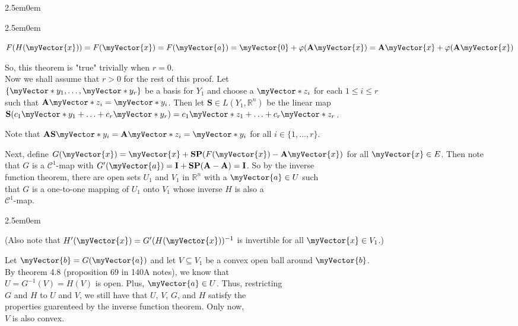 \documentclass{book}
\newenvironment{myIndent}{%
   \begin{adjustwidth}{2.5em}{0em}%
}{%
   \end{adjustwidth}%
}
\newcommand{\retTwo}{\hfill\bigbreak}
\newcommand{\mVec}[1]{\myVector{#1}}
\newcommand{\mVecAst}[1]{\myVector*{#1}}
\newcommand{\mMat}[1]{\mathbf{#1}}
\begin{document}
{\begin{myIndent}
{\begin{myIndent}
      {\centering $F(H(\mVec{x})) = F(\mVec{x}) = F(\mVec{a}) = \mVec{0} + \varphi(\mMat{A}\mVec{x}) = \mMat{A}\mVec{x} + \varphi(\mMat{A}\mVec{x})$ \retTwo\par}
      
      So, this theorem is "true" trivially when $r = 0$.\\ [8pt]

      Now we shall assume that $r > 0$ for the rest of this proof. Let\\ $\{\mVecAst{y}_1, \ldots, \mVecAst{y}_r\}$ be a basis for $Y_1$ and choose a $\mVecAst{z}_i$ for each $1 \leq i \leq r$\\ such that $\mMat{A}\mVecAst{z}_i = \mVecAst{y}_i$. Then let $\mMat{S} \in L(Y_1, \mathbb{R}^n)$ be the linear map\\ $\mMat{S}(c_1\mVecAst{y}_1 + \ldots + c_r\mVecAst{y}_r) = c_1\mVecAst{z}_1 + \ldots + c_r\mVecAst{z}_r$.\retTwo

      Note that $\mMat{AS}\mVecAst{y}_i = \mMat{A}\mVecAst{z}_i = \mVecAst{y}_i$ for all $i \in \{1, \ldots, r\}$.\retTwo

      Next, define $G(\mVec{x}) = \mVec{x} + \mMat{SP}(F(\mVec{x}) - \mMat{A}\mVec{x})$ for all $\mVec{x} \in E$. Then note\\ that $G$ is a $\mathscr{C}^1$-map with $G^\prime(\mVec{a}) = \mMat{I} + \mMat{SP}(\mMat{A} - \mMat{A}) = \mMat{I}$. So by the inverse\\ function theorem, there are open sets $U_1$ and $V_1$ in $\mathbb{R}^n$ with a $\mVec{a} \in U$ such\\ that $G$ is a one-to-one mapping of $U_1$ onto $V_1$ whose inverse $H$ is also a\\ $\mathscr{C}^1$-map.
      
      \begin{myIndent}
         (Also note that $H^\prime(\mVec{x}) = G^\prime(H(\mVec{x}))^{-1}$ is invertible for all $\mVec{x} \in V_1$.)\retTwo
      \end{myIndent}

      Let $\mVec{b} = G(\mVec{a})$ and let $V \subseteq V_1$ be a convex open ball around $\mVec{b}$.\\ By theorem 4.8 (proposition 69 in 140A notes), we know that\\ $U = G^{-1}(V) = H(V)$ is open. Plus, $\mVec{a} \in U$. Thus, restricting\\ $G$ and $H$ to $U$ and $V$, we still have that $U$, $V$, $G$, and $H$ satisfy the\\ properties guarenteed by the inverse function theorem. Only now,\\ $V$ is also convex.\retTwo


\end{myIndent}}
\end{myIndent}}
\end{document}
